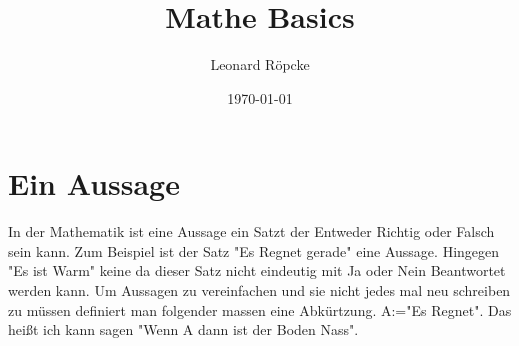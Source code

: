 \documentclass[12pt,a4paper]{article}
\title{Mathe Basics}
\author{Leonard Röpcke}
\date{\today}
\begin{document}
\maketitle
\tableofcontents
\newpage

\section{Ein Aussage}
In der Mathematik ist eine Aussage ein Satzt der Entweder Richtig oder Falsch sein kann. Zum Beispiel ist der Satz "Es Regnet gerade" eine Aussage.
Hingegen "Es ist Warm" keine da dieser Satz nicht eindeutig mit Ja oder Nein Beantwortet werden kann.
Um Aussagen zu vereinfachen und sie nicht jedes mal neu schreiben zu müssen definiert man folgender massen eine Abkürtzung. A:="Es Regnet".
Das heißt ich kann sagen "Wenn A dann ist der Boden Nass".
\end{document}
